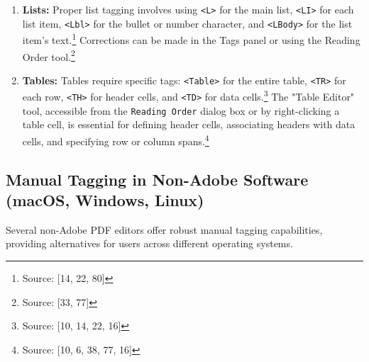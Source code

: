 \begin{enumerate}[noitemsep,topsep=0pt]
    \item \textbf{Lists:} Proper list tagging involves using \texttt{<L>} for the main list, \texttt{<LI>} for each list item, \texttt{<Lbl>} for the bullet or number character, and \texttt{<LBody>} for the list item's text.\footnote{Source: [14, 22, 80]} Corrections can be made in the Tags panel or using the Reading Order tool.\footnote{Source: [33, 77]}
    \item \textbf{Tables:} Tables require specific tags: \texttt{<Table>} for the entire table, \texttt{<TR>} for each row, \texttt{<TH>} for header cells, and \texttt{<TD>} for data cells.\footnote{Source: [10, 14, 22, 16]} The "Table Editor" tool, accessible from the \texttt{Reading Order} dialog box or by right-clicking a table cell, is essential for defining header cells, associating headers with data cells, and specifying row or column spans.\footnote{Source: [10, 6, 38, 77, 16]}
\end{enumerate}

\subsection{Manual Tagging in Non-Adobe Software (macOS, Windows, Linux)}

Several non-Adobe PDF editors offer robust manual tagging capabilities, providing alternatives for users across different operating systems.

